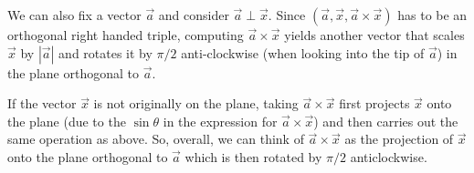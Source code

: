 \documentclass[../main.tex]{subfiles}
\begin{document}
We can also fix a vector $\vec{a}$ and consider $\vec{a} \perp \vec{x}$.
Since $(\vec{a}, \vec{x}, \vec{a} \times \vec{x})$ has to be an orthogonal right handed triple, computing $\vec{a} \times \vec{x}$ yields another vector that scales $\vec{x}$ by $|\vec{a}|$ and rotates it by $\pi/2$ anti-clockwise (when looking into the tip of $\vec{a}$) in the plane orthogonal to $\vec{a}$.
\begin{center}
\end{center}
If the vector $\vec{x}$ is not originally on the plane, taking $\vec{a} \times \vec{x}$ first projects $\vec{x}$ onto the plane (due to the $\sin \theta$ in the expression for $\vec{a} \times \vec{x}$) and then carries out the same operation as above.
So, overall, we can think of $\vec{a} \times \vec{x}$ as the projection of $\vec{x}$ onto the plane orthogonal to $\vec{a}$ which is then rotated by $\pi/2$ anticlockwise.
\end{document}

